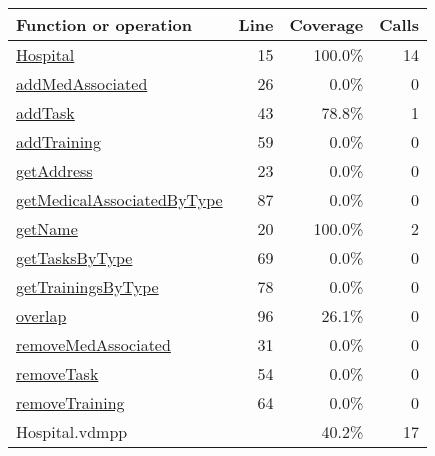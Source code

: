 \begin{longtable}{|l|r|r|r|}
\hline
Function or operation & Line & Coverage & Calls \\
\hline
\hline
\hyperref[Hospital:15]{Hospital} & 15&100.0\% & 14 \\
\hline
\hyperref[addMedAssociated:26]{addMedAssociated} & 26&0.0\% & 0 \\
\hline
\hyperref[addTask:43]{addTask} & 43&78.8\% & 1 \\
\hline
\hyperref[addTraining:59]{addTraining} & 59&0.0\% & 0 \\
\hline
\hyperref[getAddress:23]{getAddress} & 23&0.0\% & 0 \\
\hline
\hyperref[getMedicalAssociatedByType:87]{getMedicalAssociatedByType} & 87&0.0\% & 0 \\
\hline
\hyperref[getName:20]{getName} & 20&100.0\% & 2 \\
\hline
\hyperref[getTasksByType:69]{getTasksByType} & 69&0.0\% & 0 \\
\hline
\hyperref[getTrainingsByType:78]{getTrainingsByType} & 78&0.0\% & 0 \\
\hline
\hyperref[overlap:96]{overlap} & 96&26.1\% & 0 \\
\hline
\hyperref[removeMedAssociated:31]{removeMedAssociated} & 31&0.0\% & 0 \\
\hline
\hyperref[removeTask:54]{removeTask} & 54&0.0\% & 0 \\
\hline
\hyperref[removeTraining:64]{removeTraining} & 64&0.0\% & 0 \\
\hline
\hline
Hospital.vdmpp & & 40.2\% & 17 \\
\hline
\end{longtable}

